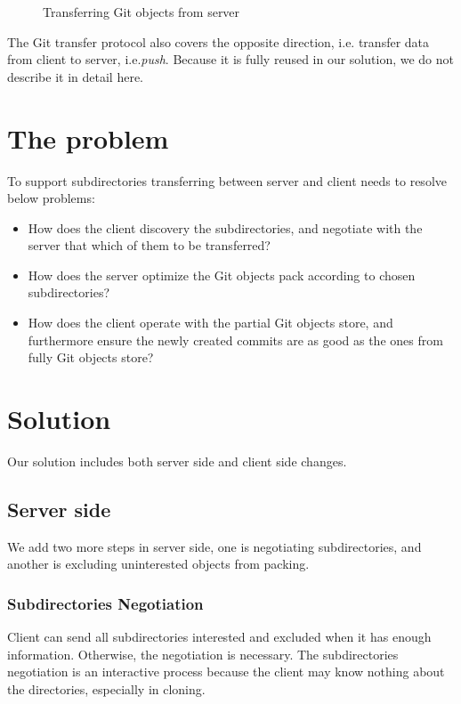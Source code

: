 \documentclass[preprint]{sigplanconf}
\begin{document}
\begin{figure}[htpb]
  \centering
  
  \caption{Transferring Git objects from server}
  \label{fig:git-proto-clone-seq}
\end{figure}
The Git transfer protocol also covers the opposite direction, i.e. transfer
data from client to server, i.e.\emph{push}.
Because it is fully reused in our solution, we do not describe it in detail
here.

\section{The problem}
To support subdirectories transferring between server and client needs to
resolve below problems:
\begin{itemize}
  \item How does the client discovery the subdirectories, and negotiate with
      the server that which of them to be transferred?

  \item How does the server optimize the Git objects pack according to chosen
      subdirectories?

  \item How does the client operate with the partial Git objects store, and
      furthermore ensure the newly created commits are as good as the ones
      from fully Git objects store?
\end{itemize}

\section{Solution}
Our solution includes both server side and client side changes.
\subsection{Server side}
We add two more steps in server side, one is negotiating subdirectories,
and another is excluding uninterested objects from packing.
\subsubsection{Subdirectories Negotiation}
Client can send all subdirectories interested and excluded when it has enough
information.
Otherwise, the negotiation is necessary.
The subdirectories negotiation is an interactive process because the client may
know nothing about the directories, especially in cloning.
\end{document}
